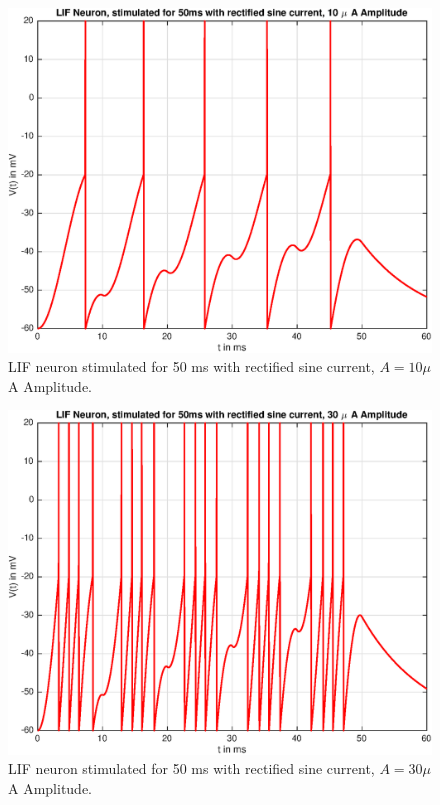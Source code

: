 \documentclass[
a4paper, 
12pt, 
]{article}
\begin{document}
\begin{figure}[h]
	\centering
	\includegraphics[width=0.7\linewidth]{Plots/LIF_10s}
	\caption{LIF neuron stimulated for 50 ms with rectified sine current, $A = 10\mu$A Amplitude.}
	\label{fig:LIF_10s}
\end{figure}

\begin{figure}[h]
	\centering
	\includegraphics[width=0.7\linewidth]{Plots/LIF_30s}
	\caption{LIF neuron stimulated for 50 ms with rectified sine current, $A = 30\mu$A Amplitude.}
	\label{fig:LIF_30s}
\end{figure}
\end{document}
